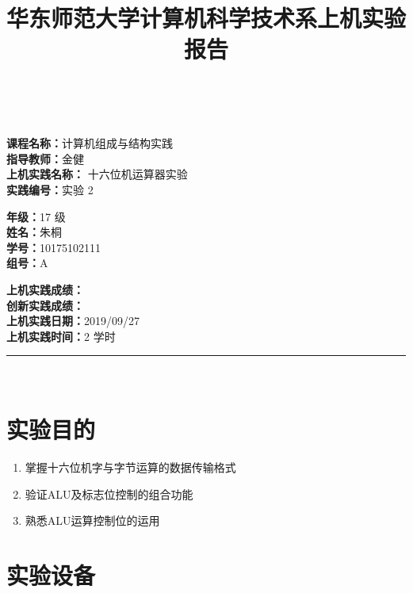 \documentclass[a4paper,10pt,UTF8]{paper}
\title{华东师范大学计算机科学技术系上机实验报告}
\numberwithin{equation}{section}
\numberwithin{figure}{section}
\begin{document}
\pagestyle{fancy}
\lhead{}
\rhead{}
\makeatletter
\def\headrule{{\if@fancyplain\let\headrulewidth\plainheadrulewidth\fi%
\color{gray}\hrule\@height 0.2pt\@width\headwidth}
  \vspace{6mm}}
\makeatother

\newcommand{\HRule}{\rule{\linewidth}{1mm}}
\newcommand{\dai}{\textbf{Dais-CMX16$^+$}}

{ \\ [0.8cm]

\small{
  \begin{minipage}[t]{.32\linewidth}
    \textbf{课程名称：}计算机组成与结构实践\\
    \textbf{指导教师：}金健\\
    \textbf{上机实践名称：} 十六位机运算器实验\\
    \textbf{实践编号：}实验 2
  \end{minipage}
  \begin{minipage}[t]{.32\linewidth}
    \textbf{年级：}17 级\\
    \textbf{姓名：}朱桐\\
    \textbf{学号：}10175102111\\
    \textbf{组号：}A
  \end{minipage} 
  \begin{minipage}[t]{.32\linewidth}
    \textbf{上机实践成绩：} \\
    \textbf{创新实践成绩：} \\
    \textbf{上机实践日期：}2019/09/27\\
    \textbf{上机实践时间：}2 学时\\
  \end{minipage}
}
\HRule \\[0.5cm]
}
\section{实验目的}

\begin{enumerate}
    \item 掌握十六位机字与字节运算的数据传输格式
    \item 验证ALU及标志位控制的组合功能
    \item 熟悉ALU运算控制位的运用
\end{enumerate}

\section{实验设备}
\end{document}
